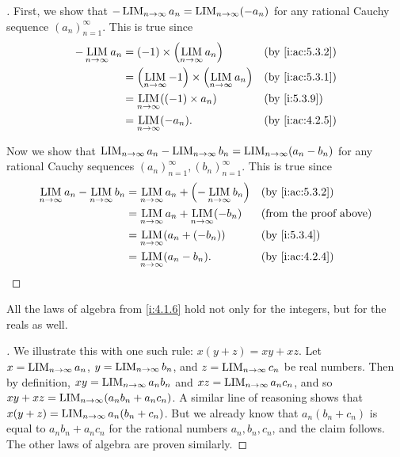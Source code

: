 \begin{proof}[]
  First, we show that \(-\operatorname*{LIM}_{n \to \infty} a_n = \operatorname*{LIM}_{n \to \infty} (-a_n)\) for any rational Cauchy sequence \((a_n)_{n = 1}^\infty\).
  This is true since
  \begin{align*}
    -\LIM_{n \to \infty} a_n & = (-1) \times \pa{\LIM_{n \to \infty} a_n}                        &  & \by{i:ac:5.3.2} \\
                             & = \pa{\LIM_{n \to \infty} -1} \times \pa{\LIM_{n \to \infty} a_n} &  & \by{i:ac:5.3.1} \\
                             & = \LIM_{n \to \infty} ((-1) \times a_n)                           &  & \by{i:5.3.9}    \\
                             & = \LIM_{n \to \infty} (-a_n).                                     &  & \by{i:ac:4.2.5}
  \end{align*}

  Now we show that \(\operatorname*{LIM}_{n \to \infty} a_n - \operatorname*{LIM}_{n \to \infty} b_n = \operatorname*{LIM}_{n \to \infty} (a_n - b_n)\) for any rational Cauchy sequences \((a_n)_{n = 1}^\infty, (b_n)_{n = 1}^\infty\).
  This is true since
  \begin{align*}
    \LIM_{n \to \infty} a_n - \LIM_{n \to \infty} b_n & = \LIM_{n \to \infty} a_n + \pa{-\LIM_{n \to \infty} b_n} &  & \by{i:ac:5.3.2}               \\
                                                      & = \LIM_{n \to \infty} a_n + \LIM_{n \to \infty} (-b_n)    &  & \text{(from the proof above)} \\
                                                      & = \LIM_{n \to \infty} (a_n + (-b_n))                      &  & \by{i:5.3.4}                  \\
                                                      & = \LIM_{n \to \infty} (a_n - b_n).                        &  & \by{i:ac:4.2.4}
  \end{align*}
\end{proof}

\begin{prop}\label{i:5.3.11}
  All the laws of algebra from \cref{i:4.1.6} hold not only for the integers, but for the reals as well.
\end{prop}

\begin{proof}[]
  We illustrate this with one such rule: \(x(y + z) = xy + xz\).
  Let \(x = \operatorname*{LIM}_{n \to \infty} a_n\), \(y = \operatorname*{LIM}_{n \to \infty} b_n\), and \(z = \operatorname*{LIM}_{n \to \infty} c_n\) be real numbers.
  Then by definition, \(xy = \operatorname*{LIM}_{n \to \infty} a_n b_n\) and \(xz = \operatorname*{LIM}_{n \to \infty} a_n c_n\), and so \(xy + xz = \operatorname*{LIM}_{n \to \infty} (a_n b_n + a_n c_n)\).
  A similar line of reasoning shows that \(x(y + z) = \operatorname*{LIM}_{n \to \infty} a_n (b_n + c_n)\).
  But we already know that \(a_n (b_n + c_n)\) is equal to \(a_n b_n + a_n c_n\) for the rational numbers \(a_n, b_n, c_n\), and the claim follows.
  The other laws of algebra are proven similarly.
\end{proof}

